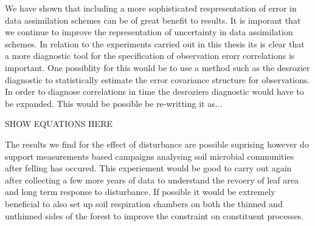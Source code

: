 We have shown that including a more sophisticated respresentation of error in data assimilation schemes can be of great benefit to results. It is imporant that we continue to improve the representation of uncertainty in data assimilation schemes. In relation to the experiments carried out in this thesis its is clear that a more diagnostic tool for the specification of observation erorr correlations is important. One possiblity for this would be to use a method such as the desrozier diagnostic to statistically estimate the error covariance structure for observations. In order to diagnose correlations in time the desroziers diagnostic would have to be expanded. This would be possible be re-writting it as...

SHOW EQUATIONS HERE

The results we find for the effect of disturbance are possible suprising however do support measurements based campaigns analysing soil microbial communities after felling has occured. This experiement would be good to carry out again after collecting a few more years of data to understand the revoery of leaf area and long term response to disturbance. If possible it would be extremely beneficial to also set up soil respiration chambers on both the thinned and unthinned sides of the forest to improve the constraint on constituent processes.